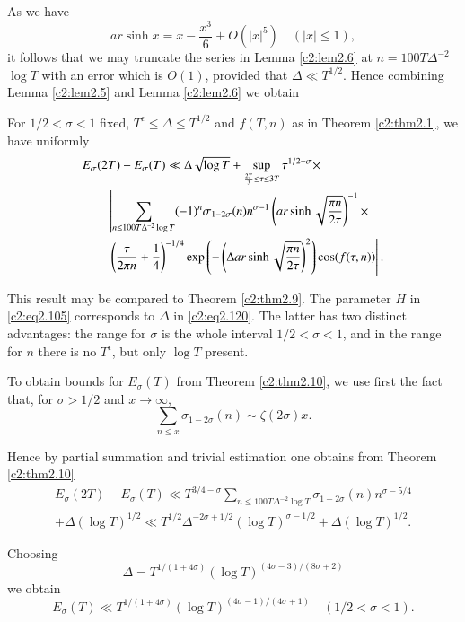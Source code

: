 As we have
$$
ar \sinh x = x - \frac{x^3}{6} + O(|x|^5) \quad (|x|\leq 1),
$$ 
it follows that we may truncate the series in Lemma \ref{c2:lem2.6} at
$n= 100 T \Delta ^{-2}$ $\log T$ with an error which is $O(1)$,
provided that $\Delta  \ll T^{1/2}$. Hence combining Lemma
\ref{c2:lem2.5} and Lemma \ref{c2:lem2.6} we obtain

\begin{thm}\label{c2:thm2.10}
  For $1/2 < \sigma < 1$ fixed, $T^\epsilon \leq \Delta  \leq
  T^{1/2}$ and $f(T, n)$ as in Theorem \ref{c2:thm2.1}, we have
  uniformly
\begin{align}
&E_\sigma (2T)-E_\sigma(T) \ll \Delta  \sqrt{\log
    T}+\sup\limits_{\frac{2T}{3} \leq \tau \leq 3 T} \tau^{1/2 -
    \sigma}\times\notag \\ 
&\qquad\left|\sum_{n \leq 100 T \Delta ^{-2} \log T} (-1)^n \sigma_{1-
      2 \sigma} (n) n^{\sigma-1} \left(ar \sinh \sqrt{\frac{\pi n}{2
        \tau}}\right)^{-1}\times\right.\notag\\ 
&\qquad\left.\left(\frac{\tau}{2 \pi n}+ \frac{1}{4}
    \right)^{-1/4} \exp \left(- \left(\Delta  ar \sinh
    \sqrt{\frac{\pi n}{2 \tau}} \right)^{2} \right) \cos (f(\tau,
    n))\right|.\label{c2:eq2.120}
  \end{align}
\end{thm}

This result may be compared to Theorem \ref{c2:thm2.9}. The parameter
$H$ in \eqref{c2:eq2.105} corresponds to $\Delta $ in
\eqref{c2:eq2.120}. The latter has two distinct advantages: the range
for $\sigma$ is the whole interval $1/2 < \sigma < 1$, and in the
range for $n$ there is no $T^\epsilon$, but only $\log T$ present.

To obtain bounds for $E_\sigma (T)$ from Theorem \ref{c2:thm2.10}, we
use first the fact that, for $\sigma > 1/2$ and $x \to \infty$,
$$
\sum_{n \leq x} \sigma_{1- 2\sigma} (n) \sim \zeta (2 \sigma) x.
$$

Hence by partial summation and trivial estimation one obtains from
Theorem \ref{c2:thm2.10} 
\begin{multline*}
E_\sigma (2T) - E_\sigma (T) \ll T^{3/4 -\sigma} \sum_{n
  \leq 100 T \Delta ^{-2} \log T} \sigma _{1- 2\sigma} (n) n^{\sigma-5/4}\\
+ \Delta  (\log T)^{1/2} \ll T^{1/2}\Delta ^{- 2 \sigma+ 1/2}
(\log T) ^{\sigma - 1/2}+ \Delta  (\log T)^{1/2}.
\end{multline*}

Choosing\pageoriginale
$$
\Delta   = T^{1/(1+ 4\sigma)} (\log T)^{(4 \sigma-3)/(8\sigma +2)}
$$
we obtain 
\begin{equation}
  E_\sigma (T) \ll T^{1/(1+ 4 \sigma)} (\log T)^{(4 \sigma-1)/ (4
  \sigma+1)} \quad (1/2 < \sigma < 1).\label{c2:eq2.121}
\end{equation}

